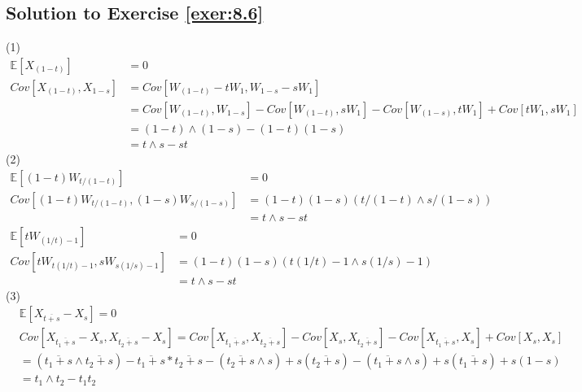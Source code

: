 \documentclass[12pt]{book}
\numberwithin{equation}{chapter}
\theoremstyle{plain}
\numberwithin{theorem}{section}
\theoremstyle{definition}
\numberwithin{exercise}{chapter}
\newcommand{\<}{\langle}
\renewcommand{\>}{\rangle}
\renewcommand{\(}{\left(}
\renewcommand{\)}{\right)}
\renewcommand{\[}{\left[}
\renewcommand{\]}{\right]}
\newcommand\Eb{\mathds{E}}
\begin{document}
\subsection*{Solution to Exercise \ref{exer:8.6}}
(1)
\begin{align}
\Eb[X_{(1-t)}] &= 0\\
Cov[X_{(1-t)}, X_{1-s}] &= Cov[W_{(1-t)} - tW_1, W_{1-s} - sW_1]\\
    &= Cov[W_{(1-t)}, W_{1-s} ] - Cov[W_{(1-t)},   sW_1] -  Cov[W_{(1-s)},   tW_1] + Cov[tW_1, sW_1]\\
    &= (1-t) \wedge (1-s) - (1-t)(1-s)\\
    &= t \wedge s - st
\end{align}
(2)
\begin{align}
\Eb[ (1-t)W_{t/(1-t)}] &= 0\\
Cov[(1-t)W_{t/(1-t)}, (1-s)W_{s/(1-s)}] &= (1-t) (1-s) ( t/(1-t) \wedge  s/(1-s)  )\\
    &= t \wedge s - st
\end{align}
\begin{align}
\Eb[ tW_{(1/t) - 1}] &= 0\\
Cov[tW_{t(1/t) - 1}, sW_{s(1/s) - 1}] &= (1-t) (1-s) ( t(1/t) - 1 \wedge  s(1/s) - 1  )\\
    &= t \wedge s - st
\end{align}
(3)
\begin{align}
&\Eb[X_{\overline{t+s}} - X_s] = 0 \\
&Cov [ X_{\overline{t_1 + s}}  -  X_s,  X_{\overline{ t_2 + s}} - X_s] = Cov[{X_{\overline{t_1 + s}},  X_{\overline{ t_2 + s}}}] - Cov[X_s, X_{\overline{ t_2 + s}} ]- Cov[X_{\overline{t_1 + s}}, X_s ] + Cov[X_s, X_s]\\
               &= (\overline{t_1 + s}  \wedge \overline{t_2 + s})- \overline{t_1 + s}*\overline{t_2 + s} - (\overline{t_2 + s} \wedge s) + s(\overline{t_2 + s}) - (\overline{t_1 + s} \wedge s) + s(\overline{t_1 + s}) + s(1-s)\\
               &= t_1 \wedge t_2 - t_1 t_2
\end{align}
\end{document}
